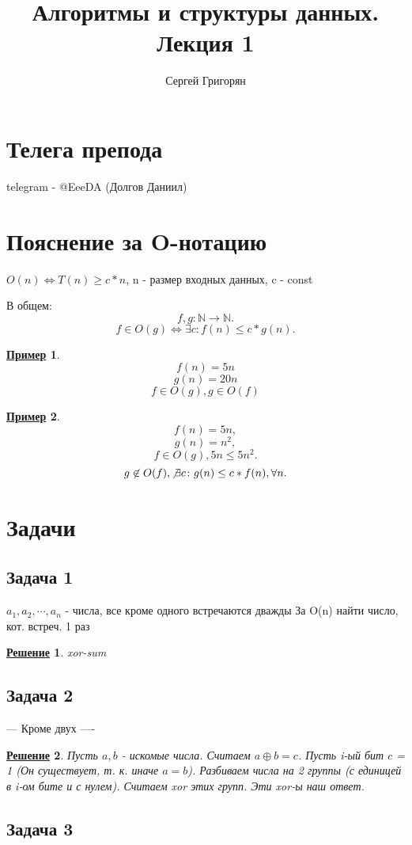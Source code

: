 \documentclass[a4, 12pt]{article}
\title{Алгоритмы и структуры данных. \\ Лекция 1}
\author{Сергей Григорян}
\newcommand{\N}{\mathbb{N}}
\newtheorem*{example}{\underline{Пример}}
\newtheorem*{solution}{\underline{Решение}}
\theoremstyle{definition}
\begin{document}
\maketitle
\newpage
\section{Телега препода}
telegram - @EeeDA (Долгов Даниил)

\section{Пояснение за O-нотацию}
$O(n) \iff T(n) \geq c * n$, n - размер входных данных, c - const

В общем:
\[
    f, g \colon \N \rightarrow \N
.\] 
\[
    f \in O(g) \iff \exists c \colon f(n) \leq c * g(n)
.\] 
\begin{example}

\[
    f(n) = 5n
\]
\[
    g(n) = 20n
\]
\[
    f \in O(g), g \in O(f)
\]
\end{example}
\begin{example}
\[
f(n) = 5n,
\] 
\[
g(n) = n^2,
\]     
\[
f \in O(g), 5n \leq 5n^2
.\] 
\[
g \not\in O(f), \not\exists c \colon g(n) \leq c * f(n), \forall n 
.\] 
\end{example}

\section{Задачи}
\subsection{Задача 1}
$a_1, a_2, \cdots, a_n$ - числа, все кроме одного встречаются дважды
За O(n) найти число, кот. встреч. 1 раз

\begin{solution}
xor-sum
\end{solution}
\subsection{Задача 2}
--- Кроме двух ----
\begin{solution}
Пусть $a, b$ - искомые числа. Считаем $a \oplus b = c$. Пусть i-ый бит $c$ = 1 (Он существует, т. к. иначе $ a = b $). Разбиваем числа на 2 группы (с единицей в i-ом бите и с нулем). Считаем xor этих групп. Эти xor-ы наш ответ.
\end{solution}

\subsection{Задача 3}
~\newline
\end{document}
